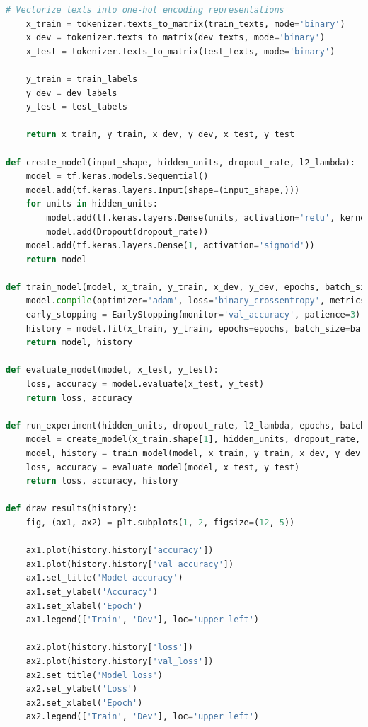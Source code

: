 \documentclass{report}
\begin{document}
\begin{lstlisting}[language=Python, caption=Implementación inicial del perceptron]
    # Vectorize texts into one-hot encoding representations
    x_train = tokenizer.texts_to_matrix(train_texts, mode='binary')
    x_dev = tokenizer.texts_to_matrix(dev_texts, mode='binary')
    x_test = tokenizer.texts_to_matrix(test_texts, mode='binary')

    y_train = train_labels
    y_dev = dev_labels
    y_test = test_labels
    
    return x_train, y_train, x_dev, y_dev, x_test, y_test

def create_model(input_shape, hidden_units, dropout_rate, l2_lambda):
    model = tf.keras.models.Sequential()
    model.add(tf.keras.layers.Input(shape=(input_shape,)))
    for units in hidden_units:
        model.add(tf.keras.layers.Dense(units, activation='relu', kernel_regularizer=regularizers.l2(l2_lambda)))
        model.add(Dropout(dropout_rate))
    model.add(tf.keras.layers.Dense(1, activation='sigmoid'))
    return model

def train_model(model, x_train, y_train, x_dev, y_dev, epochs, batch_size):
    model.compile(optimizer='adam', loss='binary_crossentropy', metrics=['accuracy'])
    early_stopping = EarlyStopping(monitor='val_accuracy', patience=3)
    history = model.fit(x_train, y_train, epochs=epochs, batch_size=batch_size, validation_data=(x_dev, y_dev), callbacks=[early_stopping])
    return model, history

def evaluate_model(model, x_test, y_test):
    loss, accuracy = model.evaluate(x_test, y_test)
    return loss, accuracy

def run_experiment(hidden_units, dropout_rate, l2_lambda, epochs, batch_size):
    model = create_model(x_train.shape[1], hidden_units, dropout_rate, l2_lambda)
    model, history = train_model(model, x_train, y_train, x_dev, y_dev, epochs, batch_size)
    loss, accuracy = evaluate_model(model, x_test, y_test)
    return loss, accuracy, history

def draw_results(history):
    fig, (ax1, ax2) = plt.subplots(1, 2, figsize=(12, 5))
    
    ax1.plot(history.history['accuracy'])
    ax1.plot(history.history['val_accuracy'])
    ax1.set_title('Model accuracy')
    ax1.set_ylabel('Accuracy')
    ax1.set_xlabel('Epoch')
    ax1.legend(['Train', 'Dev'], loc='upper left')
    
    ax2.plot(history.history['loss'])
    ax2.plot(history.history['val_loss'])
    ax2.set_title('Model loss')
    ax2.set_ylabel('Loss')
    ax2.set_xlabel('Epoch')
    ax2.legend(['Train', 'Dev'], loc='upper left')
    

\end{lstlisting}
\end{document}

